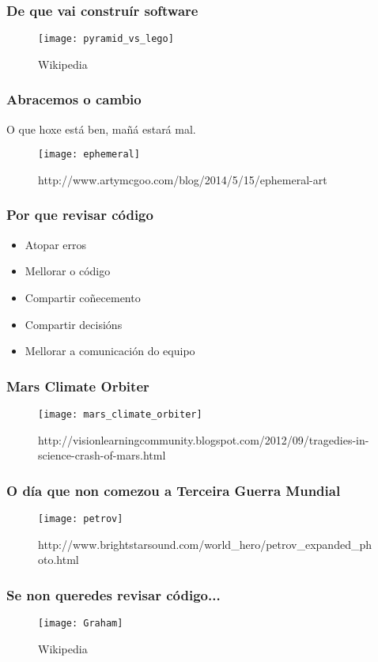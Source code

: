\begin{frame}
  \frametitle{De que vai construír software}
  \begin{figure}[ht]
    \texttt{[image: pyramid\_vs\_lego]}
    \caption{Wikipedia}
  \end{figure}
\end{frame}

\begin{frame}
  \frametitle{Abracemos o cambio}
    \centering
    O que hoxe está ben, mañá estará mal.
    \begin{figure}[ht]
      \texttt{[image: ephemeral]}
      \caption{http://www.artymcgoo.com/blog/2014/5/15/ephemeral-art}
    \end{figure}
\end{frame}

\begin{frame}
  \frametitle{Por que revisar código}
  \begin{itemize}
  \item Atopar erros
  \item Mellorar o código
  \item Compartir coñecemento
  \item Compartir decisións
  \item Mellorar a comunicación do equipo
  \end{itemize}
\end{frame}

\begin{frame}
  \frametitle{Mars Climate Orbiter}
  \begin{figure}[ht]
    \texttt{[image: mars\_climate\_orbiter]}
    \caption{http://visionlearningcommunity.blogspot.com/2012/09/tragedies-in-science-crash-of-mars.html}
  \end{figure}
\end{frame}

\begin{frame}
  \frametitle{O día que non comezou a Terceira Guerra Mundial}
  \begin{figure}[ht]
    \texttt{[image: petrov]}
    \caption{http://www.brightstarsound.com/world\_hero/petrov\_expanded\_photo.html}
  \end{figure}
\end{frame}

\begin{frame}
  \frametitle{Se non queredes revisar código...}
  \begin{figure}[ht]
    \texttt{[image: Graham]}
    \caption{Wikipedia}
  \end{figure}
\end{frame}

